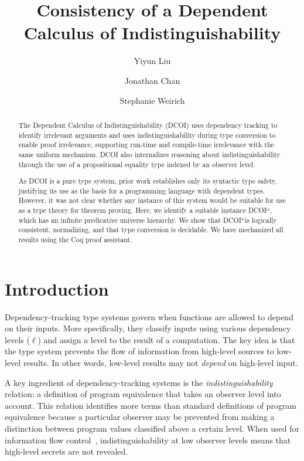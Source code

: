 \documentclass[acmsmall, screen=true, nonacm=true,
  review=\ifpublic false\else true\fi,
  anonymous=\ifanonymous true\else false\fi
]{acmart}
\title{Consistency of a Dependent Calculus of Indistinguishability} %
\author{Yiyun Liu}
\affiliation{%
  \institution{University of Pennsylvania}
  \city{Philadelphia}
  \country{USA}
}
\author{Jonathan Chan}
\affiliation{%
  \institution{University of Pennsylvania}
  \city{Philadelphia}
  \country{USA}
}
\author{Stephanie Weirich}
\affiliation{%
  \institution{University of Pennsylvania}
  \city{Philadelphia}
  \country{USA}
}
\makeatletter
\newcommand{\sw}[1]{}
\newcommand{\dcoi}{DCOI\@\xspace}
\newcommand{\name}{\texorpdfstring{DCOI$^{\omega}$\@\xspace}{DCOI-omega}}
\makeatother
\begin{document}
\setlength{\jot}{0pt}

\begin{abstract}
  The Dependent Calculus of Indistinguishability (\dcoi) uses dependency
  tracking to identify irrelevant arguments and uses indistinguishability
  during type conversion to enable proof irrelevance, supporting run-time and
  compile-time irrelevance with the same uniform mechanism. \dcoi also
  internalizes reasoning about indistinguishability through the use of a
  propositional equality type indexed by an observer level.

  As \dcoi is a pure type system, prior work establishes only its syntactic
  type safety, justifying its use as the basis for a programming language with
  dependent types.  However, it was not clear whether any instance of this
  system would be suitable for use as a type theory for theorem proving.
  Here, we identify a suitable instance \name, which has an infinite
  predicative universe hierarchy. We show that \name is logically consistent,
  normalizing, and that type conversion is decidable. We have
  mechanized all results using the Coq proof assistant.  \sw{I don't think we
    need to go into details about our proof technique.}
\end{abstract}

\maketitle

\section{Introduction}

Dependency-tracking type systems govern when functions are allowed to depend
on their inputs. More specifically, they classify inputs using various
dependency levels ($\ell$) and assign a level to the result of a
computation. The key idea is that the type system prevents the flow of
information from high-level sources to low-level results. In other words,
low-level results may not \emph{depend} on high-level input.

A key ingredient of dependency-tracking systems is the
\emph{indistinguishability} relation: a definition of program equivalence that
takes an observer level into account. This relation identifies more terms
than standard definitions of program equivalence because a particular
observer may be prevented from making a distinction between program values
classified above a certain level. When used for information flow
control~\cite{abadi:dcc}, indistinguishability at low observer levels means
that high-level secrets are not revealed.
\end{document}

